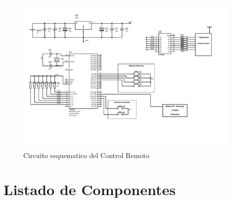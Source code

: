 \documentclass[a4paper,10pt]{article}
\begin{document}
			
			\begin{figure}[!htb]
				\centering
				\includegraphics[width=11cm]{Imagenes/EsquematicoControl.PDF}
				\caption{Circuito esquematico del Control Remoto} \label{limg002}
			\end{figure}
	
	\section{Listado de Componentes}
	
\end{document}
